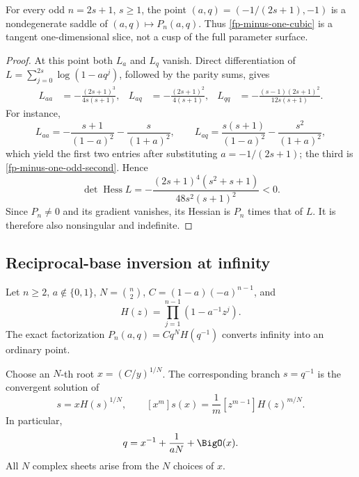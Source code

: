 \begin{corollary}
\label{fp-minus-one-morse}
For every odd \(n=2s+1\), \(s\geq1\), the point
\((a,q)=(-1/(2s+1),-1)\) is a nondegenerate saddle of
\((a,q)\mapsto P_n(a,q)\).  Thus \cref{fp-minus-one-cubic} is a tangent
one-dimensional slice, not a cusp of the full parameter surface.
\end{corollary}

\begin{proof}
At this point both \(L_a\) and \(L_q\) vanish.  Direct differentiation of
\(L=\sum_{j=0}^{2s}\log(1-aq^j)\), followed by the parity sums, gives
\begin{align*}
 L_{aa}&=-\frac{(2s+1)^3}{4s(s+1)},&
 L_{aq}&=-\frac{(2s+1)^2}{4(s+1)},&
 L_{qq}&=-\frac{(s-1)(2s+1)^2}{12s(s+1)}.
\end{align*}
For instance,
\[
 L_{aa}=-\frac{s+1}{(1-a)^2}-\frac{s}{(1+a)^2},\qquad
 L_{aq}=\frac{s(s+1)}{(1-a)^2}-\frac{s^2}{(1+a)^2},
\]
which yield the first two entries after substituting \(a=-1/(2s+1)\); the
third is \cref{fp-minus-one-odd-second}.  Hence
\begin{equation}
 \det\operatorname{Hess}L
 =-\frac{(2s+1)^4(s^2+s+1)}{48s^2(s+1)^2}<0.
 \label{fp-minus-one-hessian}
\end{equation}
Since \(P_n\ne0\) and its gradient vanishes, its Hessian is \(P_n\) times that
of \(L\).  It is therefore also nonsingular and indefinite.
\end{proof}

\subsection{Reciprocal-base inversion at infinity}

Let \(n\geq2\), \(a\notin\{0,1\}\), \(N=\binom n2\),
\(C=(1-a)(-a)^{n-1}\), and
\[
 H(z)=\prod_{j=1}^{n-1}(1-a^{-1}z^j).
\]
The exact factorization \(P_n(a,q)=Cq^NH(q^{-1})\) converts infinity into an
ordinary point.

\begin{theorem}
\label{fp-base-infinity}
Choose an \(N\)-th root \(x=(C/y)^{1/N}\).  The corresponding branch
\(s=q^{-1}\) is the convergent solution of
\begin{equation}
 s=xH(s)^{1/N},\qquad
 [x^m]s(x)=\frac1m[z^{m-1}]H(z)^{m/N}.
 \label{fp-infinity-lagrange}
\end{equation}
In particular,
\begin{equation}
 q=x^{-1}+\frac1{aN}+\BigO(x).
 \label{fp-infinity-first}
\end{equation}
All \(N\) complex sheets arise from the \(N\) choices of \(x\).
\end{theorem}

